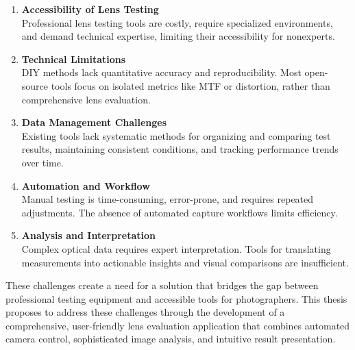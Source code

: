 \begin{enumerate}
    \item \textbf{Accessibility of Lens Testing} \\
        Professional lens testing tools are costly, require specialized environments, and demand technical expertise, limiting their accessibility for nonexperts.
        
    \item \textbf{Technical Limitations} \\
        DIY methods lack quantitative accuracy and reproducibility. Most open-source tools focus on isolated metrics like MTF or distortion, rather than comprehensive lens evaluation.
        
    \item \textbf{Data Management Challenges} \\
        Existing tools lack systematic methods for organizing and comparing test results, maintaining consistent conditions, and tracking performance trends over time.

    \item \textbf{Automation and Workflow} \\
        Manual testing is time-consuming, error-prone, and requires repeated adjustments. The absence of automated capture workflows limits efficiency.

    \item \textbf{Analysis and Interpretation} \\
        Complex optical data requires expert interpretation. Tools for translating measurements into actionable insights and visual comparisons are insufficient.
\end{enumerate}

These challenges create a need for a solution that bridges the gap between professional testing equipment and accessible tools for photographers. This thesis proposes to address these challenges through the development of a comprehensive, user-friendly lens evaluation application that combines automated camera control, sophisticated image analysis, and intuitive result presentation.


